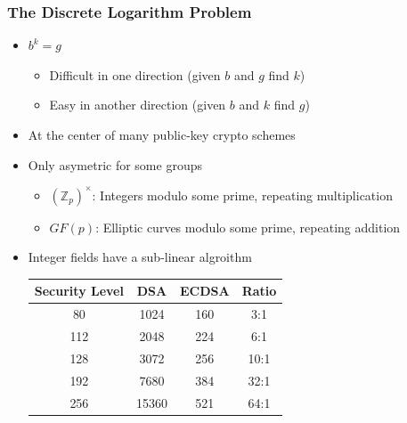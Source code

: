 \documentclass{beamer}
\begin{document}
\begin{frame}
  \frametitle{The Discrete Logarithm Problem}

  \begin{itemize}
  \item $b^k = g$
    \begin{itemize}
    \item Difficult in one direction (given $b$ and $g$ find $k$)
    \item Easy in another direction (given $b$ and $k$ find $g$)
    \end{itemize}
  \item At the center of many public-key crypto schemes
  \item Only asymetric for some groups
    \begin{itemize}
    \item $({\mathbb Z}_p)^\times$: Integers modulo some prime,
      repeating multiplication
    \item $GF(p)$: Elliptic curves modulo some prime, repeating
      addition
    \end{itemize}
  \item Integer fields have a sub-linear algroithm
    \begin{center}
      \begin{tabular}{cccc}
        Security Level & DSA & ECDSA & Ratio \\
        \hline
        80 & 1024 & 160 & 3:1 \\
        112 & 2048 & 224 & 6:1 \\
        128 & 3072 & 256 & 10:1 \\
        192 & 7680 & 384 & 32:1 \\
        256 & 15360 & 521 & 64:1 \\
      \end{tabular}
    \end{center}
  \end{itemize}
\end{frame}
\end{document}
